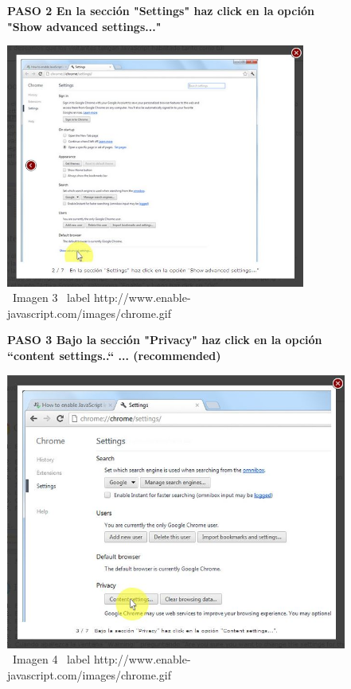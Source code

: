 \documentclass[11pt]{article} %
\begin{document}
\begin{figure}
\begin{center}
\begin{center}


\bf PASO 2
En la sección "Settings" haz click en la 
opción "Show advanced settings..."
\end{center}
\includegraphics[height=8cm, width=8 cm] {imagenes/chrome 02.JPG}
\newline
\  Imagen 3
\ label { http://www.enable-javascript.com/images/chrome.gif }
\newline




\begin{center}
\bf PASO 3
Bajo la sección "Privacy" haz click en la opción 
``content settings..`` ... (recommended)
\newline
\end{center}
\includegraphics[height=8 cm, width=8 cm] {imagenes/chrome 03.JPG}
\newline
\ Imagen 4
\ label { http://www.enable-javascript.com/images/chrome.gif }
\newline


\end{center}
\end{figure}
\end{document}
